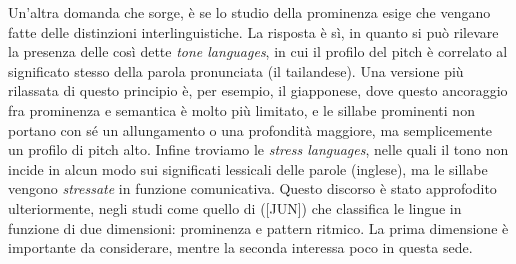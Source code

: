 \documentclass[twoside,twocolumn,11pt]{extarticle}
\theoremstyle{definition}
\begin{document}
	Un'altra domanda che sorge, è se lo studio della prominenza esige che vengano fatte delle distinzioni interlinguistiche. La risposta è sì, in quanto si può rilevare la presenza delle così dette \textit{tone languages}, in cui il profilo del pitch è correlato al significato stesso della parola pronunciata (il tailandese). Una versione più rilassata di questo principio è, per esempio, il giapponese, dove questo ancoraggio fra prominenza e semantica è molto più limitato, e le sillabe prominenti non portano con sé un allungamento o una profondità maggiore, ma semplicemente un profilo di pitch alto. Infine troviamo le \textit{stress languages}, nelle quali il tono non incide in alcun modo sui significati lessicali delle parole (inglese), ma le sillabe vengono \textit{stressate} in funzione comunicativa. Questo discorso è stato approfodito ulteriormente, negli studi come quello di ([JUN]) che classifica le lingue in funzione di due dimensioni: prominenza e pattern ritmico. La prima dimensione è importante da considerare, mentre la seconda interessa poco in questa sede.
\end{document}
